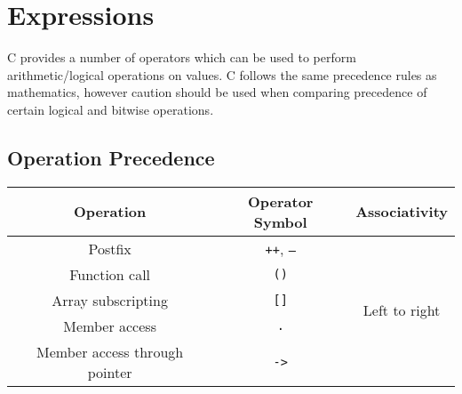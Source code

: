 \documentclass{report}
\begin{document}
\chapter{Expressions}
C provides a number of operators which can be used to perform
arithmetic/logical operations on values. C follows the same precedence
rules as mathematics, however caution should be used when comparing
precedence of certain logical and bitwise operations.
\section{Operation Precedence}
\begin{table}[H]
    \centering
    \begin{tabular}{c c c}
        \toprule
        \textbf{Operation}            & \textbf{Operator Symbol}                                                                                                                                                                                                  & \textbf{Associativity}         \\
        \midrule
        Postfix                       & \texttt{++}, \texttt{--}                                                                                                                                                                                    & \multirow{5}{*}{Left to right} \\
        Function call                 & \texttt{()}                                                                                                                                                                                                        &                                \\
        Array subscripting            & \texttt{[]}                                                                                                                                                                                                        &                                \\
        Member access                 & \texttt{.}                                                                                                                                                                                                         &                                \\
        Member access through pointer & \texttt{->}                                                                                                                                                                                                        &                                \\

\end{tabular}
\end{table}
\end{document}
